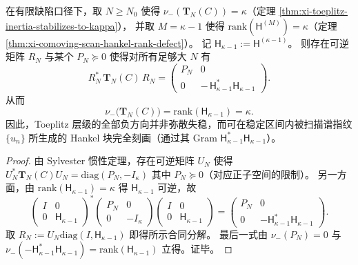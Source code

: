 \begin{corollary}\label{cor:xi-toeplitz-scan-hankel-congruence-decomposition}
在有限缺陷口径下，取 \(N\ge N_0\) 使得 \(\nu_-(\mathbf{T}_N(C))=\kappa\)（定理 \ref{thm:xi-toeplitz-inertia-stabilizes-to-kappa}），
并取 \(M=\kappa-1\) 使得 \(\mathrm{rank}(\mathsf H^{(M)})=\kappa\)（定理 \ref{thm:xi-comoving-scan-hankel-rank-defect}）。
记 \(\mathsf H_{\kappa-1}:=\mathsf H^{(\kappa-1)}\)。
则存在可逆矩阵 \(R_N\) 与某个 \(P_N\succeq 0\) 使得对所有足够大 \(N\) 有
\[
\boxed{\;
R_N^\ast\,\mathbf{T}_N(C)\,R_N
=
\begin{pmatrix}
P_N & 0\\[2pt]
0 & -\,\mathsf H_{\kappa-1}^{\ast}\mathsf H_{\kappa-1}
\end{pmatrix}. \;}
\]
从而
\[
\boxed{\;
\nu_-\!\bigl(\mathbf{T}_N(C)\bigr)=\mathrm{rank}(\mathsf H_{\kappa-1})=\kappa. \;}
\]
因此，Toeplitz 层级的全部负方向并非弥散失稳，而可在稳定区间内被扫描谱指纹 \(\{u_n\}\) 所生成的 Hankel 块完全刻画（通过其 Gram \(\mathsf H_{\kappa-1}^{\ast}\mathsf H_{\kappa-1}\)）。
\end{corollary}

\begin{proof}
由 Sylvester 惯性定理，存在可逆矩阵 \(U_N\) 使得
\(
U_N^\ast\mathbf{T}_N(C)U_N=\mathrm{diag}(P_N,-I_{\kappa})
\)
其中 \(P_N\succeq 0\)（对应正子空间的限制）。
另一方面，由 \(\mathrm{rank}(\mathsf H_{\kappa-1})=\kappa\) 得 \(\mathsf H_{\kappa-1}\) 可逆，故
\[
\begin{pmatrix} I & 0\\ 0 & \mathsf H_{\kappa-1}\end{pmatrix}^{\!\ast}
\begin{pmatrix} P_N & 0\\ 0 & -I_{\kappa}\end{pmatrix}
\begin{pmatrix} I & 0\\ 0 & \mathsf H_{\kappa-1}\end{pmatrix}
=
\begin{pmatrix} P_N & 0\\ 0 & -\mathsf H_{\kappa-1}^{\ast}\mathsf H_{\kappa-1}\end{pmatrix}.
\]
取 \(R_N:=U_N\mathrm{diag}(I,\mathsf H_{\kappa-1})\) 即得所示合同分解。
最后一式由 \(\nu_-(P_N)=0\) 与 \(\nu_-( -\mathsf H_{\kappa-1}^{\ast}\mathsf H_{\kappa-1})=\mathrm{rank}(\mathsf H_{\kappa-1})\) 立得。证毕。
\end{proof}

